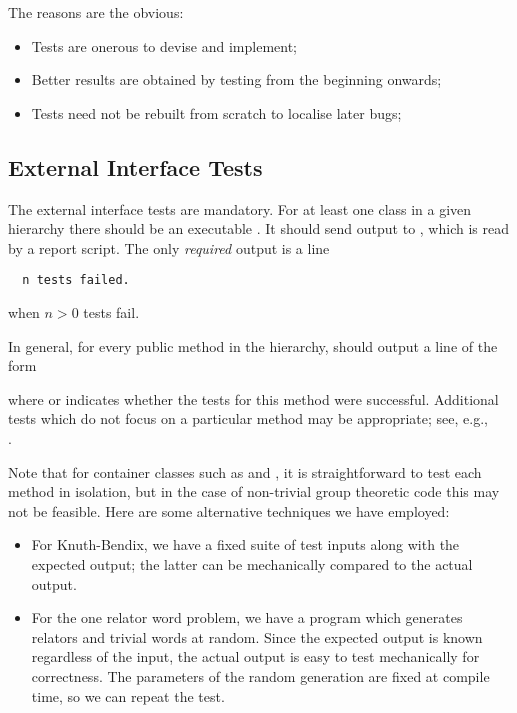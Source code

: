 The reasons are the obvious:

\begin{itemize}

\item
Tests are onerous to devise and implement;

\item
Better results are obtained by testing from the beginning onwards;

\item
Tests need not be rebuilt from scratch to localise later bugs;

\end{itemize}

\subsection{External Interface Tests}

The external interface tests are mandatory.
For at least one class  in a given hierarchy there should be
an executable .
It should send output to , which is read by a report script.
The only {\em required} output is a line
\begin{verbatim}
  n tests failed.
\end{verbatim}
when $n > 0$ tests fail.

In general, for every public method in the hierarchy,
 should output a line of the form


\noindent where \code{+} or \code{-} indicates whether the tests for this
method were successful. Additional tests which do not focus on a
particular method may be appropriate; see, e.g., \\
.

Note that for container classes such as  and
, it is straightforward to test each method in isolation,
but in the case of non-trivial group theoretic code this may not be
feasible. Here are some alternative techniques we have employed:

\begin{itemize}
\item
For Knuth-Bendix, we have a fixed suite of test inputs along with the
expected output; the latter can be mechanically compared to the actual
output.

\item
For the one relator word problem, we have a program which generates
relators and trivial words at random. Since the expected output is
known regardless of the input, the actual output is easy to test
mechanically for correctness. The parameters of the random generation
are fixed at compile time, so we can repeat the test.
\end{itemize}


